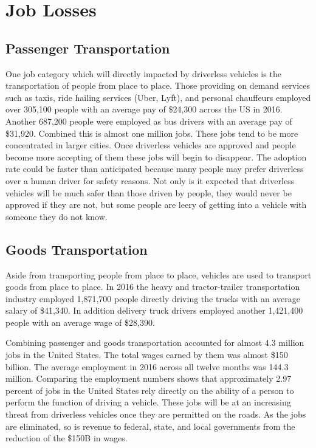 \documentclass[sigconf]{acmart}
\begin{document}
\section{Job Losses}
\subsection{Passenger Transportation}

One job category which will directly impacted by driverless vehicles is the 
transportation of people from place to place.  Those providing on demand 
services such as taxis, ride hailing services (Uber, Lyft), and personal 
chauffeurs employed over 305,100 people with an average pay of \$24,300 across 
the US in 2016\cite{BLSOnDemandDrivers}.  Another 687,200 people were employed 
as bus drivers with an average pay of \$31,920\cite{BLSBusDrivers}.  Combined 
this is almost one million jobs.  These jobs tend to be more concentrated in 
larger cities.  Once driverless vehicles are approved and people become more 
accepting of them these jobs will begin to disappear.  The adoption rate could 
be faster than anticipated because many people may prefer driverless over a 
human driver for safety reasons.  Not only is it expected that driverless 
vehicles will be much safer than those driven by people, they would never be 
approved if they are not, but some people are leery of getting into a vehicle 
with someone they do not know.  
  
\subsection{Goods Transportation}

Aside from transporting people from place to place, vehicles are used to 
transport goods from place to place.  In 2016 the heavy and tractor-trailer 
transportation industry employed 1,871,700 people directly driving the trucks 
with an average salary of \$41,340\cite{BLSBigTrucks}.  In addition delivery 
truck drivers employed another 1,421,400 people with an average wage of 
\$28,390\cite{BLSDeliveryDrivers}.  

Combining passenger and goods transportation accounted for almost 4.3 million 
jobs in the United States.  The total wages earned by them was almost \$150 
billion.  The average employment in 2016 across all twelve months was 144.3 
million\cite{BLSUSEmployment}.  Comparing the employment numbers shows that 
approximately 2.97 percent of jobs in the United States rely directly on the 
ability of a person to perform the function of driving a vehicle.  These jobs 
will be at an increasing threat from driverless vehicles once they are 
permitted on the roads.  As the jobs are eliminated, so is revenue to federal, 
state, and local governments from the reduction of the \$150B in wages.
\end{document}
